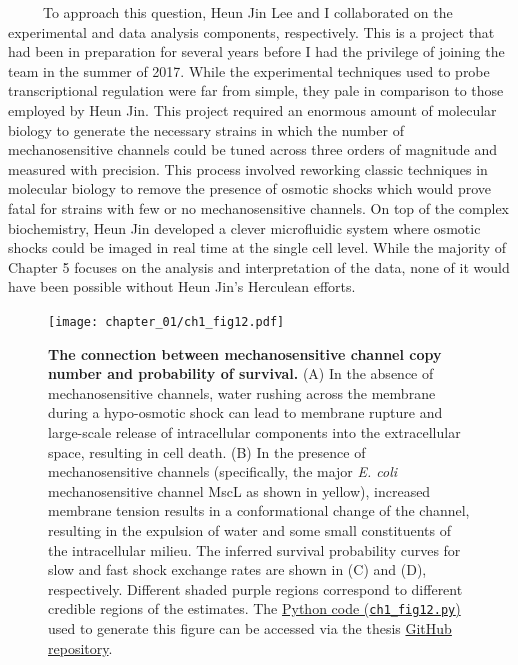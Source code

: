 \documentclass[12pt]{caltech_thesis}
\begin{document}
~~~~~To approach this question, Heun Jin Lee and I collaborated on the
experimental and data analysis components, respectively. This is a
project that had been in preparation for several years before I had the
privilege of joining the team in the summer of 2017. While the
experimental techniques used to probe transcriptional regulation were
far from simple, they pale in comparison to those employed by Heun Jin.
This project required an enormous amount of molecular biology to
generate the necessary strains in which the number of mechanosensitive
channels could be tuned across three orders of magnitude and measured
with precision. This process involved reworking classic techniques in
molecular biology to remove the presence of osmotic shocks which would
prove fatal for strains with few or no mechanosensitive channels. On top
of the complex biochemistry, Heun Jin developed a clever microfluidic
system where osmotic shocks could be imaged in real time at the single
cell level. While the majority of Chapter 5 focuses on the analysis and
interpretation of the data, none of it would have been possible without
Heun Jin's Herculean efforts.

\hypertarget{fig:mscl_intro}{%
\begin{figure}
\centering
\texttt{[image: chapter\_01/ch1\_fig12.pdf]}
\caption[{The connection between mechanosensitive channel number and
probability of survival.}]{\textbf{The connection between
mechanosensitive channel copy number and probability of survival.} (A)
In the absence of mechanosensitive channels, water rushing across the
membrane during a hypo-osmotic shock can lead to membrane rupture and
large-scale release of intracellular components into the extracellular
space, resulting in cell death. (B) In the presence of mechanosensitive
channels (specifically, the major \emph{E. coli} mechanosensitive
channel MscL as shown in yellow), increased membrane tension results in
a conformational change of the channel, resulting in the expulsion of
water and some small constituents of the intracellular milieu. The
inferred survival probability curves for slow and fast shock exchange
rates are shown in (C) and (D), respectively. Different shaded purple
regions correspond to different credible regions of the estimates. The
\href{https://github.com/gchure/phd/blob/master/src/chapter_01/code/ch1_fig12.py}{Python
code (\texttt{ch1\_fig12.py})} used to generate this figure can be
accessed via the thesis \href{https://github.com/gchure/phd}{GitHub
repository}.}
\label{fig:mscl_intro}
\end{figure}
}
\end{document}
